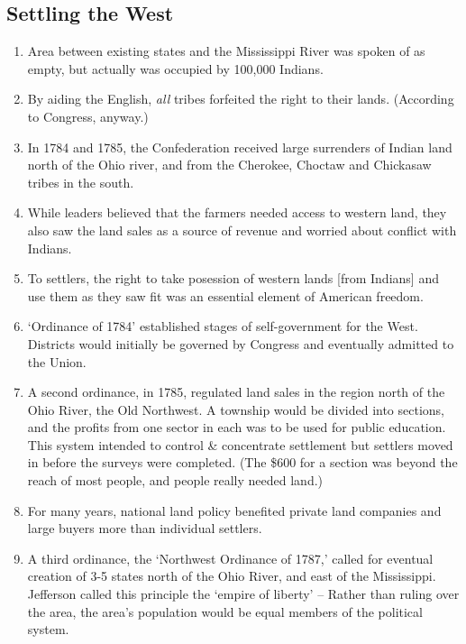 \documentclass{article}
\begin{document}
    \subsection{Settling the West}
    \begin{enumerate}
      \item Area between existing states and the Mississippi River was spoken of as empty, but actually was occupied by 100,000 Indians. 
      \item By aiding the English, \emph{all} tribes forfeited the right to their lands. (According to Congress, anyway.)
      \item In 1784 and 1785, the Confederation received large surrenders of Indian land north of the Ohio river, and from the Cherokee, Choctaw and Chickasaw tribes in the south.
      \item While leaders believed that the farmers needed access to western land, they also saw the land sales as a source of revenue and worried about conflict with Indians.
      \item To settlers, the right to take posession of western lands [from Indians] and use them as they saw fit was an essential element of American freedom.
      \item `Ordinance of 1784' established stages of self-government for the West. Districts would initially be governed by Congress and eventually admitted to the Union.
      \item A second ordinance, in 1785, regulated land sales in the region north of the Ohio River, the Old Northwest. A township would be divided into sections, and the profits from one sector in each was to be used for public education. This system intended to control \& concentrate settlement but settlers moved in before the surveys were completed. (The \$600 for a section was beyond the reach of most people, and people really needed land.)
      \item For many years, national land policy benefited private land companies and large buyers more than individual settlers.
      \item A third ordinance, the `Northwest Ordinance of 1787,' called for eventual creation of 3-5 states north of the Ohio River, and east of the Mississippi. Jefferson called this principle the `empire of liberty' -- Rather than ruling over the area, the area's population would be equal members of the political system.
    \end{enumerate}
\end{document}
